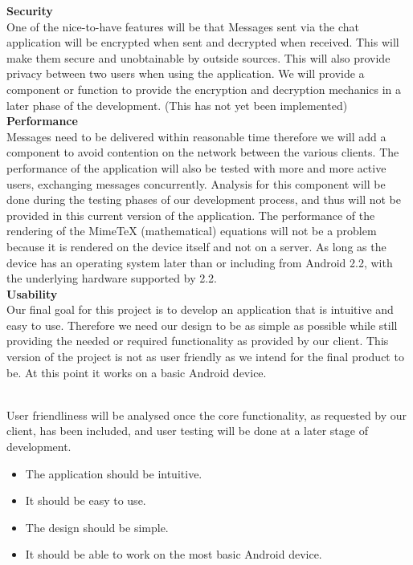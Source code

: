\documentclass[29pt,a4paper]{moderncv}
\begin{document}
			\noindent\textbf{Security}\\
				One of the nice-to-have features will be that Messages sent via the chat application will be encrypted when sent and decrypted when received. This will make them secure and unobtainable by outside sources. This will also provide privacy between two users when using the application. We will provide a component or function to provide the encryption and decryption mechanics in a later phase of the development. (This has not yet been implemented)\\
			
			\noindent\textbf{Performance}\\
				Messages need to be delivered within reasonable time therefore we will add a component to avoid contention on the network between the various clients. The performance of the application will also be tested with more and more active users, exchanging messages concurrently. Analysis for this component will be done during the testing phases of our development process, and thus will not be provided in this current version of the application.
				The performance of the rendering of the MimeTeX (mathematical) equations will not be a problem because it is rendered on the device itself and not on a server. As long as the device has an operating system later than or including from Android 2.2, with the underlying hardware supported by 2.2.\\
				
			\noindent\textbf{Usability}
				\\Our final goal for this project is to develop an application that is intuitive and easy to use.  Therefore we need our design to be as simple as possible while still providing the needed or required functionality as provided by our client.  This version of the project is not as user friendly as we intend for the final product to be.  At this point it works on a basic Android device.  
				
				\\User friendliness will be analysed once the core functionality, as requested by our client, has been included, and user testing will be done at a later stage of development.
				\begin{itemize}
					\item The application should be intuitive.
					\item It should be easy to use.
					\item The design should be simple.
					\item It should be able to work on the most basic Android device.\\
				\end{itemize}
				
\end{document}
